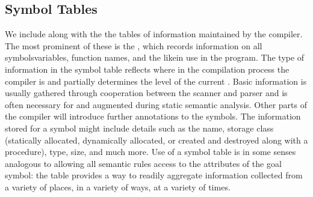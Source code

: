 \subsection{Symbol Tables}
We include along with the \IR{} the tables of information maintained by the compiler. The most prominent of these is the , which records information on all symbols\empause variables, function names, and the like\empause in use in the program. The type of information in the symbol table reflects where in the compilation process the compiler is and partially determines the level of the current \IR. Basic information is usually gathered through cooperation between the scanner and parser and is often necessary for and augmented during static semantic analysis. Other parts of the compiler will introduce further annotations to the symbols. The information stored for a symbol might include details such as the name, storage class (statically allocated, dynamically allocated, or created and destroyed along with a procedure), type, size, and much more. Use of a symbol table is in some senses analogous to allowing all semantic rules access to the attributes of the goal symbol: the table provides a way to readily aggregate information collected from a variety of places, in a variety of ways, at a variety of times.